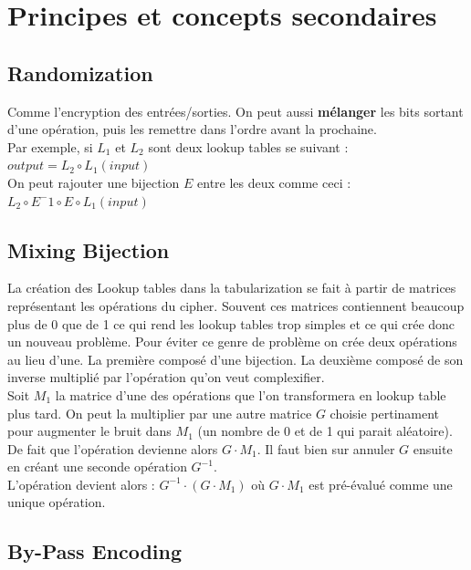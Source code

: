 \documentclass[a4paper,12pt]{article}
\begin{document}
\section{Principes et concepts secondaires}

\subsection{Randomization}

Comme l'encryption des entrées/sorties. On peut aussi \textbf{mélanger} les bits sortant d'une opération, puis les remettre dans l'ordre avant la prochaine.\\

Par exemple, si $L_1$ et $L_2$ sont deux lookup tables se suivant :\\
$output = L_2 \circ L_1(input)$\\
 On peut rajouter une bijection $E$ entre les deux comme ceci :\\
$L_2 \circ E^-1 \circ E \circ L_1(input)$


\subsection{Mixing Bijection}

La création des Lookup tables dans la tabularization se fait à partir de matrices représentant les opérations du cipher. Souvent ces matrices contiennent beaucoup plus de 0 que de 1 ce qui rend les lookup tables trop simples et ce qui crée donc un nouveau problème. Pour éviter ce genre de problème on crée deux opérations au lieu d'une. La première composé d'une bijection. La deuxième composé de son inverse multiplié par l'opération qu'on veut complexifier.\\
Soit $M_1$ la matrice d'une des opérations que l'on transformera en lookup table plus tard. On peut la multiplier par une autre matrice $G$ choisie pertinament pour augmenter le bruit dans $M_1$ (un nombre de 0 et de 1 qui parait aléatoire). De fait que l'opération devienne alors $G \cdot M_1$. Il faut bien sur annuler $G$ ensuite en créant une seconde opération $G^{-1}$.\\
L'opération devient alors : $G^{-1} \cdot (G \cdot M_1)$ où $G \cdot M_1$ est pré-évalué comme une unique opération.


\subsection{By-Pass Encoding}
\end{document}
